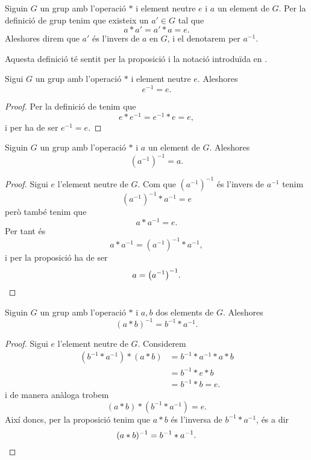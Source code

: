 \documentclass[../Apunts.tex]{subfiles}
\begin{document}
	\begin{definition}
		\label{def:l'invers d'un element d'un grup}
		Siguin \(G\) un grup amb l'operació \(\ast\) i element neutre \(e\) i \(a\) un element de \(G\). Per la definició de grup tenim que existeix un \(a'\in G\) tal que
		\[a\ast a'=a'\ast a=e.\]
		Aleshores direm que \(a'\) és l'invers de \(a\) en \(G\), i el denotarem per \(a^{-1}\).
		
		Aquesta definició té sentit per la proposició  i la notació introduïda en .
	\end{definition}
	\begin{proposition}
		\label{prop:l'invers de l'element neutre d'un grup és ell mateix}
		Sigui \(G\) un grup amb l'operació \(\ast\) i element neutre \(e\). Aleshores
		\[e^{-1}=e.\]
		\begin{proof}
			Per la definició de  tenim que
			\[e\ast e^{-1}=e^{-1}\ast e=e,\]
			i per ha de ser \(e^{-1}=e\).
		\end{proof}
	\end{proposition}
	\begin{proposition}
		\label{prop:grups:l'invers de l'invers d'un element es l'element}
		Siguin \(G\) un grup amb l'operació \(\ast\) i \(a\) un element de \(G\). Aleshores
		\[\left(a^{-1}\right)^{-1}=a.\]
		\begin{proof}
			Sigui \(e\) l'element neutre de \(G\). Com que \(\left(a^{-1}\right)^{-1}\) és l'invers de \(a^{-1}\) tenim
			\[\left(a^{-1}\right)^{-1}\ast a^{-1}=e\]
			però també tenim que
			\[a\ast a^{-1}=e.\]
			Per tant és
			\[a\ast a^{-1}=(a^{-1})^{-1}\ast a^{-1},\]
			i per la proposició  ha de ser
			\[a=\left(a^{-1}\right)^{-1}.\qedhere\]
		\end{proof}
	\end{proposition}
	\begin{proposition}
		\label{prop:invers de a b = b invers a invers}
		Siguin \(G\) un grup amb l'operació \(\ast\) i \(a,b\) dos elements de \(G\). Aleshores
		\[(a\ast b)^{-1}=b^{-1}\ast a^{-1}.\]
		\begin{proof}
			Sigui \(e\) l'element neutre de \(G\). Considerem
			\begin{align*}
			(b^{-1}\ast a^{-1})\ast(a\ast b)&=b^{-1}\ast a^{-1}\ast a\ast b\\
			&=b^{-1}\ast e\ast b\\
			&=b^{-1}\ast b=e.
			\end{align*}
			i de manera anàloga trobem
			\[(a\ast b)\ast(b^{-1}\ast a^{-1})=e.\]
			Així doncs, per la proposició  tenim que \(a\ast b\) és l'inversa de \(b^{-1}\ast a^{-1}\), és a dir
			\[(a\ast b)^{-1}=b^{-1}\ast a^{-1}.\qedhere\]
		\end{proof}
	\end{proposition}
\end{document}
